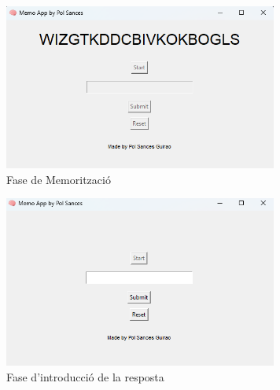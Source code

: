 \begin{figure}[h!]
    \centering
    \includegraphics[width=9cm]{img/figures/app-fase2.png}
    \caption{Fase de Memorització}
    \label{fig:fase-memo}
\end{figure}

\begin{figure}[h!]
    \centering
    \includegraphics[width=9cm]{img/figures/app-fase3.png}
    \caption{Fase d'introducció de la resposta}
    \label{fig:fase-resp}
\end{figure}
